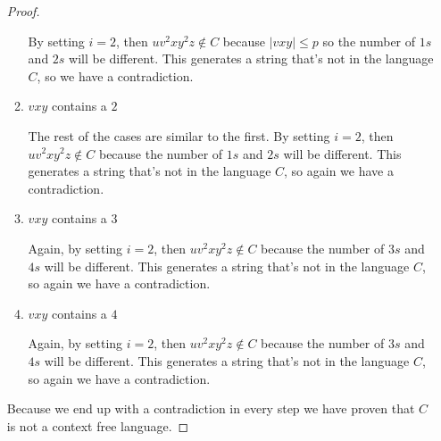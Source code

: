 \documentclass[11pt]{article}
\begin{document}
\begin{enumerate}
\begin{proof}
\begin{enumerate}
By setting $i=2$, then $uv^2xy^2z \not \in C$ because $|vxy| \leq p$ so the number of $1s$ and $2s$ will be different.  This generates a string that's not in the language $C$, so we have a contradiction.  

\item{} $vxy$ contains a $2$

The rest of the cases are similar to the first.  By setting $i=2$, then $uv^2xy^2z \not \in C$ because the number of $1s$ and $2s$ will be different.  This generates a string that's not in the language $C$, so again we have a contradiction.  

\item{} $vxy$ contains a $3$

Again, by setting $i=2$, then $uv^2xy^2z \not \in C$ because the number of $3s$ and $4s$ will be different.  This generates a string that's not in the language $C$, so again we have a contradiction.  

\item{} $vxy$ contains a $4$

Again, by setting $i=2$, then $uv^2xy^2z \not \in C$ because the number of $3s$ and $4s$ will be different.  This generates a string that's not in the language $C$, so again we have a contradiction.  
\end{enumerate}
Because we end up with a contradiction in every step we have proven that $C$ is not a context free language.  
\end{proof}

\end{enumerate}
\end{document}
